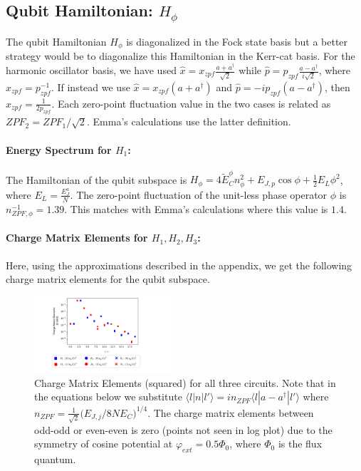 \documentclass[prx,showpacs,notitlepage,twocolumn,superscriptaddress,nofootinbib,preprintnumbers,floatfix]{revtex4-2}
\begin{document}
\subsection{Qubit Hamiltonian: $H_\phi$}
The qubit Hamiltonian $H_{\phi}$ is diagonalized in the Fock state basis but a better strategy would be to diagonalize this Hamiltonian in the Kerr-cat basis. For the harmonic oscillator basis, we have used $\hat x=x_{zpf}\frac{a+a^\dagger}{\sqrt{2}}$ while $\hat p=p_{zpf}\frac{a-a^\dagger}{i\sqrt{2}}$, where $x_{zpf}=p_{zpf}^{-1}$. If instead we use $\hat x=x_{zpf}(a+a^\dagger)$ and $\hat p=-ip_{zpf}(a-a^\dagger)$, then $x_{zpf}=\frac{1}{2p_{zpf}}$. Each zero-point fluctuation value in the two cases is related as $ZPF_2=ZPF_1/\sqrt{2}$. Emma's calculations use the latter definition.
\paragraph{Energy Spectrum for $H_1$:}
The Hamiltonian of the qubit subspace is $H_\phi=4\tilde{E}_C^\phi n_\phi^2+E_{J,p}\cos{\phi}+\frac{1}{2}E_L\phi^2$, where $E_L=\frac{E_J^a}{N}$. The zero-point fluctuation of the unit-less phase operator $\phi$ is $n_{ZPF,\phi}^{-1}=1.39$. This matches with Emma's calculations where this value is $1.4$. 
\paragraph{Charge Matrix Elements for $H_1,H_2,H_3$:}
Here, using the approximations described in the appendix, we get the following charge matrix elements for the qubit subspace.
\begin{figure}[tbh]
    \centering
\includegraphics[width=0.45\textwidth]{Figures/Charge_Matrix.pdf}
    \caption{Charge Matrix Elements (squared) for all three circuits. Note that in the equations below we substitute $\langle l|n|l'\rangle=in_{ZPF}\langle l|a-a^\dagger|l'\rangle$ where $n_{ZPF}=\frac{1}{\sqrt{2}}\Big(E_{J,j}/8NE_C\Big)^{1/4}$. The charge matrix elements between odd-odd or even-even is zero (points not seen in log plot) due to the symmetry of cosine potential at $\varphi_{ext}=0.5\Phi_0$, where $\Phi_0$ is the flux quantum.}
    \label{charge-matrix}
\end{figure}
\end{document}

